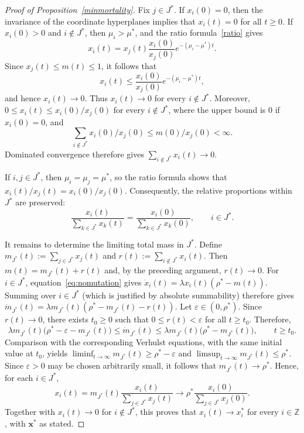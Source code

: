 \documentclass[12pt]{article}
\newcommand{\Z}{\ensuremath{\mathbb Z}}
\newcommand{\bx}{\boldsymbol{x}}
\begin{document}
\begin{proof}[Proof of Proposition~\ref{minmortality}]
Fix $j\in J^*$. If $x_i(0)=0$, then the invariance of the coordinate
hyperplanes implies that $x_i(t)=0$ for all $t\geq0$. If $x_i(0)>0$
and $i\notin J^*$, then $\mu_i>\mu^*$, and the ratio
formula~\eqref{ratio} gives
$$
x_i(t) = x_j(t)\frac{x_i(0)}{x_j(0)} e^{-(\mu_i-\mu^*)t}.
$$
Since $x_j(t)\leq m(t)\leq1$, it follows that
$$
x_i(t) \leq \frac{x_i(0)}{x_j(0)} e^{-(\mu_i-\mu^*)t},
$$
and hence $x_i(t)\to 0$. Thus $x_i(t)\to 0$ for every $i\notin J^*$.
Moreover, $0\leq x_i(t)\leq x_i(0)/x_j(0)$ for every
$i\notin J^*$, where the upper bound is $0$ if $x_i(0)=0$, and
$$
\sum_{i\notin J^*}x_i(0)/x_j(0)\leq m(0)/x_j(0)<\infty.
$$
Dominated convergence therefore gives $\sum_{i\notin J^*}x_i(t)\to 0$.

If $i,j\in J^*$, then $\mu_i=\mu_j=\mu^*$, so the ratio formula
shows that $x_i(t)/x_j(t)=x_i(0)/x_j(0)$. Consequently, the relative
proportions within $J^*$ are preserved:
$$
\frac{x_i(t)}{\sum_{k\in J^*}x_k(t)}
=
\frac{x_i(0)}{\sum_{k\in J^*}x_k(0)},
\qquad i\in J^*.
$$

It remains to determine the limiting total mass in $J^*$. Define
$m_{J^*}(t):=\sum_{j\in J^*}x_j(t)$ and
$r(t):=\sum_{i\notin J^*}x_i(t)$. Then
$m(t)=m_{J^*}(t)+r(t)$ and, by the preceding argument, $r(t)\to 0$.
For $i\in J^*$, equation~\eqref{eq:nomutation} gives $\dot
x_i(t)=\lambda x_i(t)(\rho^*-m(t))$. Summing over $i\in J^*$ (which is
justified by absolute summability) therefore gives $\dot
m_{J^*}(t)=\lambda m_{J^*}(t) (\rho^*-m_{J^*}(t)-r(t))$.
Let $\varepsilon\in(0,\rho^*)$. Since $r(t)\to 0$, there exists
$t_0\geq0$ such that $0\leq r(t)<\varepsilon$ for all $t\geq t_0$.
Therefore,
$$
\lambda m_{J^*}(t)\bigl(\rho^*-\varepsilon-m_{J^*}(t)\bigr)
\leq\dot m_{J^*}(t)
\leq\lambda m_{J^*}(t)\bigl(\rho^*-m_{J^*}(t)\bigr),
\qquad t\geq t_0.
$$
Comparison with the corresponding Verhulst equations, with the same
initial value at $t_0$, yields
$\liminf_{t\to\infty}m_{J^*}(t)\geq\rho^*-\varepsilon$ and
$\limsup_{t\to\infty}m_{J^*}(t)\leq\rho^*$. Since $\varepsilon>0$
may be chosen arbitrarily small, it follows that
$m_{J^*}(t)\to\rho^*$.
Hence, for each $i\in J^*$,
$$
x_i(t)
=m_{J^*}(t)\frac{x_i(t)}{\sum_{j\in J^*}x_j(t)}
\longrightarrow
\rho^*\frac{x_i(0)}{\sum_{j\in J^*}x_j(0)}.
$$
Together with $x_i(t)\to 0$ for $i\notin J^*$, this proves that
$x_i(t)\to x_i^*$ for every $i\in\Z$, with $\bx^*$ as stated.
\end{proof}
\end{document}
